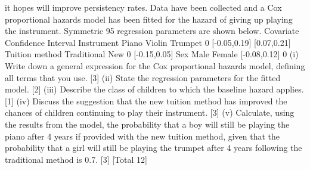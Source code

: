 it hopes will improve persistency rates. Data have been collected and a Cox
proportional hazards model has been fitted for the hazard of giving up playing the
instrument. Symmetric 95%
regression parameters are shown below.
Covariate
Confidence Interval
Instrument
Piano
Violin
Trumpet 0
[-0.05,0.19]
[0.07,0.21]
Tuition method
Traditional
New 0
[-0.15,0.05]
Sex
Male
Female
[-0.08,0.12]
0
(i) Write down a general expression for the Cox proportional hazards model,
defining all terms that you use.
[3]
(ii) State the regression parameters for the fitted model. [2]
(iii) Describe the class of children to which the baseline hazard applies. [1]
(iv) Discuss the suggestion that the new tuition method has improved the chances
of children continuing to play their instrument.
[3]
(v) Calculate, using the results from the model, the probability that a boy will still
be playing the piano after 4 years if provided with the new tuition method,
given that the probability that a girl will still be playing the trumpet after 4
years following the traditional method is 0.7.
[3]
[Total 12]
